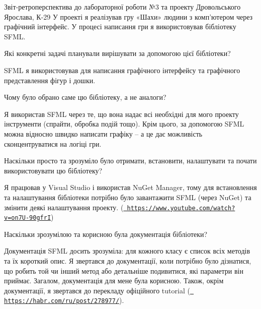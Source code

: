 Звіт-\/ретроперспектива до лабораторної роботи №3 та проекту Дровольського Ярослава, К-\/29 У проекті я реалізував гру «Шахи» людини з комп’ютером через графічний інтерфейс. У процесі написання гри я використовував бібліотеку SFML.
\begin{DoxyEnumerate}
\item Які конкретні задачі планували вирішувати за допомогою цієї бібліотеки?
\end{DoxyEnumerate}

SFML я використовував для написання графічного інтерфейсу та графічного представлення фігур і дошки.


\begin{DoxyEnumerate}
\item Чому було обрано саме цю бібліотеку, а не аналоги?
\end{DoxyEnumerate}

Я використав SFML через те, що вона надає всі необхідні для мого проекту інструменти (спрайти, обробка подій тощо). Крім цього, за допомогою SFML можна відносно швидко написати графіку – а це дає можливість сконцентруватися на логіці гри.


\begin{DoxyEnumerate}
\item Наскільки просто та зрозуміло було отримати, встановити, налаштувати та почати використовувати цю бібліотеку?
\end{DoxyEnumerate}

Я працював у Visual Studio і використав Nu\+Get Manager, тому для встановлення та налаштування бібліотеки потрібно було завантажити SFML (через Nu\+Get) та змінити деякі налаштування проекту. (\href{https://www.youtube.com/watch?v=on7U-90gfrI}{\texttt{ https\+://www.\+youtube.\+com/watch?v=on7\+U-\/90gfrI}})


\begin{DoxyEnumerate}
\item Наскільки зрозумілою та корисною була документація бібліотеки?
\end{DoxyEnumerate}

Документація SFML досить зрозуміла\+: для кожного класу є список всіх методів та їх короткий опис. Я звертався до документації, коли потрібно було дізнатися, що робить той чи інший метод або детальніше подивитися, які параметри він приймає. Загалом, документація для мене була корисною. Також, окрім документації, я звертався до перекладу офіційного tutorial (\href{https://habr.com/ru/post/278977/}{\texttt{ https\+://habr.\+com/ru/post/278977/}}).



